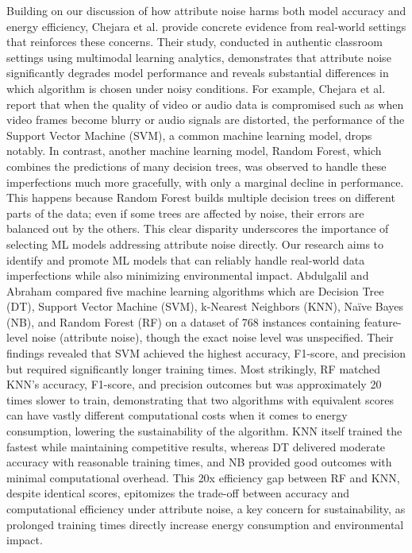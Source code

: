\documentclass[conference]{IEEEtran}
\begin{document}
\newline
\newline
\newline
Building on our discussion of how attribute noise harms both model accuracy and energy efficiency, Chejara et al. \cite{chejara2024impact} provide concrete evidence from real-world settings that reinforces these concerns. Their study, conducted in authentic classroom settings using multimodal learning analytics, demonstrates that attribute noise significantly degrades model performance and reveals substantial differences in which algorithm is chosen under noisy conditions. For example, Chejara et al. \cite{chejara2024impact} report that when the quality of video or audio data is compromised such as when video frames become blurry or audio signals are distorted, the performance of the Support Vector Machine (SVM), a common machine learning model, drops notably. In contrast, another machine learning model, Random Forest, which combines the predictions of many decision trees, was observed to handle these imperfections much more gracefully, with only a marginal decline in performance. This happens because Random Forest builds multiple decision trees on different parts of the data; even if some trees are affected by noise, their errors are balanced out by the others. This clear disparity underscores the importance of selecting ML models addressing attribute noise directly. Our research aims to identify and promote ML models that can reliably handle real-world data imperfections while also minimizing environmental impact.
\newline
\newline
Abdulgalil and Abraham \cite{abduljalil} compared five machine learning algorithms which are Decision Tree (DT), Support Vector Machine (SVM), k-Nearest Neighbors (KNN), Naïve Bayes (NB), and Random Forest (RF) on a dataset of 768 instances containing feature-level noise (attribute noise), though the exact noise level was unspecified. Their findings revealed that SVM achieved the highest accuracy, F1-score, and precision but required significantly longer training times. Most strikingly, RF matched KNN’s accuracy, F1-score, and precision outcomes but was approximately 20 times slower to train, demonstrating that two algorithms with equivalent scores can have vastly different computational costs when it comes to energy consumption, lowering the sustainability of the algorithm. KNN itself trained the fastest while maintaining competitive results, whereas DT delivered moderate accuracy with reasonable training times, and NB provided good outcomes with minimal computational overhead. This 20x efficiency gap between RF and KNN, despite identical scores, epitomizes the trade-off between accuracy and computational efficiency under attribute noise, a key concern for sustainability, as prolonged training times directly increase energy consumption and environmental impact.
\end{document}
